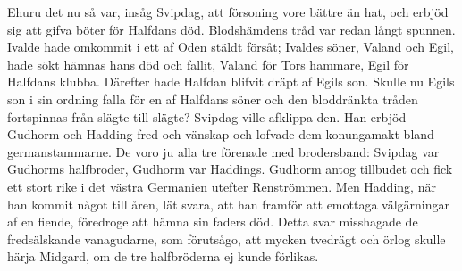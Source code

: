 Ehuru det nu så var, insåg Svipdag, att försoning vore bättre än hat,
och erbjöd sig att gifva böter för Halfdans död. Blodshämdens tråd var
redan långt spunnen. Ivalde hade omkommit i ett af Oden stäldt försåt;
Ivaldes söner, Valand och Egil, hade sökt hämnas hans död och fallit,
Valand för Tors hammare, Egil för Halfdans klubba. Därefter hade Halfdan
blifvit dräpt af Egils son. Skulle nu Egils son i sin ordning falla för
en af Halfdans söner och den bloddränkta tråden fortspinnas från slägte
till slägte? Svipdag ville afklippa den. Han erbjöd Gudhorm och Hadding
fred och vänskap och lofvade dem konungamakt bland germanstammarne. De
voro ju alla tre förenade med brodersband: Svipdag var Gudhorms
halfbroder, Gudhorm var Haddings. Gudhorm antog tillbudet och fick ett
stort rike i det västra Germanien utefter Renströmmen. Men Hadding, när
han kommit något till åren, lät svara, att han framför att emottaga
välgärningar af en fiende, föredroge att hämna sin faders död. Detta
svar misshagade de fredsälskande vanagudarne, som förutsågo, att mycken
tvedrägt och örlog skulle härja Midgard, om de tre halfbröderna ej kunde
förlikas.

